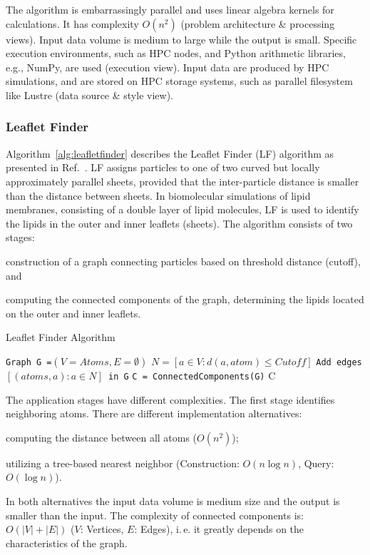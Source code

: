The algorithm is embarrassingly parallel and uses linear algebra kernels for calculations.
It has complexity $O(n^2)$ (problem architecture \& processing views).
Input data volume is medium to large while the output is small.
Specific execution environments, such as HPC nodes, and Python arithmetic libraries, e.g., NumPy, are used (execution view).
Input data are produced by HPC simulations, and are stored on HPC storage systems, such as parallel filesystem like Lustre (data source \& style view).

\subsubsection*{Leaflet Finder}Algorithm~\ref{alg:leafletfinder} describes the Leaflet Finder (LF) algorithm as presented in Ref.~\cite{michaud2011mdanalysis}.
LF assigns particles to one of two curved but locally approximately parallel sheets, provided that the inter-particle distance is smaller than the distance between sheets.
In biomolecular simulations of lipid membranes, consisting of a double layer of lipid molecules, LF is used to identify the lipids in the outer and inner leaflets (sheets).
The algorithm consists of two stages:
\begin{inparaenum}[a)]
    \item construction of a graph connecting particles based on threshold distance (cutoff), and
    \item computing the connected components of the graph, determining the lipids located on the outer and inner leaflets.
\end{inparaenum}

\begin{algorithm}[ht]
    \scriptsize
    \caption{Leaflet Finder Algorithm}
    \label{alg:leafletfinder}
    \begin{algorithmic}[1]
        \State \texttt{Graph G =$(V=Atoms,E=\emptyset)$}
        \State \texttt{$N = [a\in V: d(a,atom)\le Cutoff]$}
        \State \texttt{Add edges $[(atoms,a): a \in N]$ in G}
        \EndFor
        \State \texttt{C = ConnectedComponents(G)}
        \State \Return C
        \EndProcedure
    \end{algorithmic}
\end{algorithm}

The application stages have different complexities.
The first stage identifies neighboring atoms.
There are different implementation alternatives: 
\begin{inparaenum}[i)]
    \item computing the distance between all atoms ($O(n^2)$);
    \item utilizing a tree-based nearest neighbor (Construction: $O(n\log n)$, 
    Query: $O(\log n)$).
\end{inparaenum}
In both alternatives the input data volume is medium size and the output is smaller than the input.
The complexity of connected components is: $O(|V|+|E|)$ ($V$: Vertices, $E$: Edges), i.\,e. it greatly depends on the characteristics of the graph.


